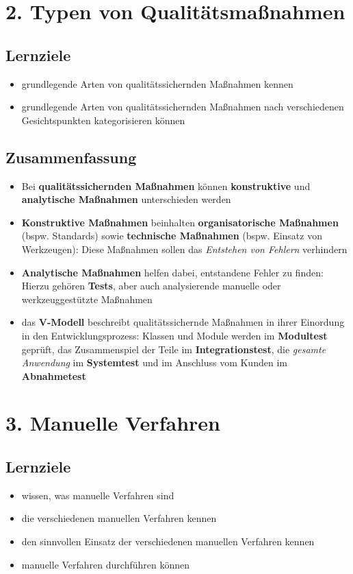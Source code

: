 \section*{2. Typen von Qualitätsmaßnahmen}
\subsection*{Lernziele}
\begin{itemize}
    \item grundlegende Arten von qualitätssichernden Maßnahmen kennen
    \item grundlegende Arten von qualitätssichernden Maßnahmen nach verschiedenen Gesichtspunkten kategorisieren können
\end{itemize}

\subsection*{Zusammenfassung}
\begin{itemize}
    \item Bei \textbf{qualitätssichernden Maßnahmen} können \textbf{konstruktive} und \textbf{analytische Maßnahmen} unterschieden werden
    \item \textbf{Konstruktive Maßnahmen} beinhalten \textbf{organisatorische Maßnahmen} (bspw. Standards)
    sowie \textbf{technische Maßnahmen} (bspw. Einsatz von Werkzeugen): Diese Maßnahmen sollen das \textit{Entstehen von Fehlern} verhindern
    \item \textbf{Analytische Maßnahmen} helfen dabei, entstandene Fehler zu finden: Hierzu gehören \textbf{Tests}, aber auch analysierende manuelle oder werkzeuggestützte Maßnahmen
    \item das \textbf{V-Modell} beschreibt qualitätssichernde Maßnahmen in ihrer Einordung in den Entwicklungsprozess: Klassen und Module werden im \textbf{Modultest} geprüft, das Zusammenspiel der Teile im \textbf{Integrationstest}, die \textit{gesamte Anwendung} im \textbf{Systemtest} und im Anschluss vom Kunden im \textbf{Abnahmetest}
\end{itemize}

\section*{3. Manuelle Verfahren}
\subsection*{Lernziele}
\begin{itemize}
    \item wissen, was manuelle Verfahren sind
    \item die verschiedenen manuellen Verfahren kennen
    \item den sinnvollen Einsatz der verschiedenen manuellen Verfahren kennen
    \item manuelle Verfahren durchführen können
\end{itemize}

